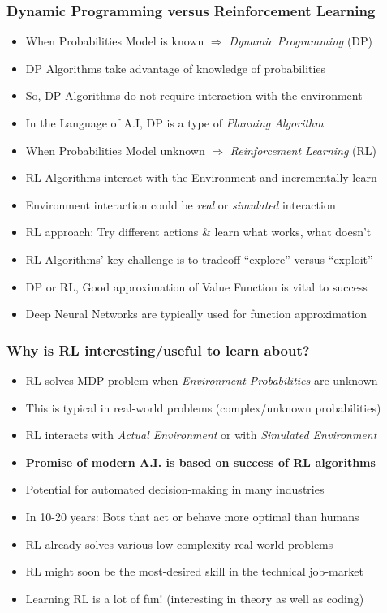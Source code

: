 \documentclass[handout]{beamer}
\begin{document}
\begin{frame}
\frametitle{Dynamic Programming versus Reinforcement Learning}
\pause
\begin{itemize}[<+->]
\item When Probabilities Model is known $\Rightarrow$ {\em Dynamic Programming} (DP)
\item DP Algorithms take advantage of knowledge of probabilities
\item So, DP Algorithms do not require interaction with the environment
\item In the Language of A.I, DP is a type of {\em Planning Algorithm}
\item When Probabilities Model unknown $\Rightarrow$ {\em Reinforcement Learning} (RL)
\item RL Algorithms interact with the Environment and incrementally learn
\item Environment interaction could be {\em real} or {\em simulated} interaction
\item RL approach: Try different actions \& learn what works, what doesn't
\item RL Algorithms' key challenge is to tradeoff ``explore'' versus ``exploit''
\item DP or RL, Good approximation of Value Function is vital to success
\item Deep Neural Networks are typically used for function approximation
\end{itemize}
\end{frame}


\begin{frame}
\frametitle{Why is RL interesting/useful to learn about?}
\pause
\begin{itemize}[<+->]
\item RL solves MDP problem when {\em Environment Probabilities} are unknown
\item This is typical in real-world problems (complex/unknown probabilities)
\item RL interacts with {\em Actual Environment} or with {\em Simulated Environment}

\item {\bf Promise of modern A.I. is based on success of RL algorithms}
\item Potential for automated decision-making in many industries
\item In 10-20 years: Bots that act or behave more optimal than humans
\item RL already solves various low-complexity real-world problems
\item RL might soon be the most-desired skill in the technical job-market
\item Learning RL is a lot of fun! (interesting in theory as well as coding)
\end{itemize}
\end{frame}
\end{document}
